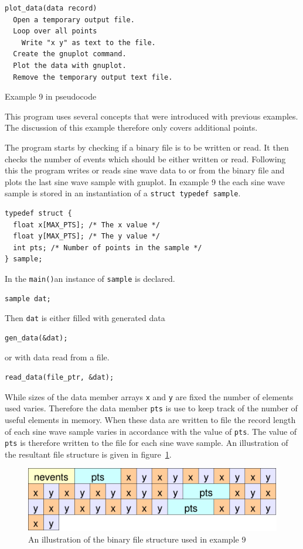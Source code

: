 \documentclass[11pt]{scrartcl}
\def\main{\texttt{main()}}
\begin{document}
\begin{pseudocode}[h]
\begin{verbatim}
plot_data(data record)
  Open a temporary output file.
  Loop over all points
    Write "x y" as text to the file.
  Create the gnuplot command.
  Plot the data with gnuplot.
  Remove the temporary output text file.
\end{verbatim}
\caption{Example 9 in pseudocode \label{pseudo:ex9_plot_data}}
\end{pseudocode}

This program uses several concepts that were introduced with
previous examples.  The discussion of this example therefore only
covers additional points.

The program starts by checking if a binary file is to be written or
read.  It then checks the number of events which should be either
written or read.  Following this the program writes or reads sine wave
data to or from the binary file and plots the last sine wave sample with
gnuplot.  In example 9 the each sine wave sample is stored in an
instantiation of a \texttt{struct}~\texttt{typedef}~\texttt{sample}.
\begin{lstlisting}
typedef struct {
  float x[MAX_PTS]; /* The x value */
  float y[MAX_PTS]; /* The y value */
  int pts; /* Number of points in the sample */
} sample;
\end{lstlisting}
In the \main an instance of \texttt{sample} is declared.
\begin{lstlisting}
sample dat;
\end{lstlisting}
Then \texttt{dat} is either filled with generated data
\begin{lstlisting}
gen_data(&dat);
\end{lstlisting}
or with data read from a file.
\begin{lstlisting}
read_data(file_ptr, &dat);
\end{lstlisting}
While sizes of the data member arrays \texttt{x} and \texttt{y} are
fixed the number of elements used varies.  Therefore the data member
\texttt{pts} is use to keep track of the number of useful elements in
memory.  When these data are written to file the record length of each
sine wave sample varies in accordance with the value of \texttt{pts}.
The value of \texttt{pts} is therefore written to the file for each
sine wave sample.  An illustration of the resultant file structure is given in
figure~\ref{figure:ex9_file_structure}.
%
\begin{figure}[h]
\begin{center}
\includegraphics[width=12cm]{figures/ex9_file_structure}
\caption{An illustration of the binary file structure used in example 9
\label{figure:ex9_file_structure}}
\end{center}
\end{figure}
\end{document}
